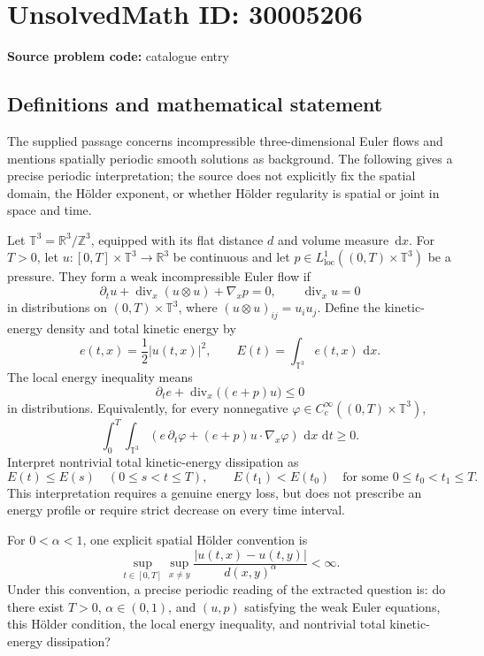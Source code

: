 \documentclass[11pt]{article}
\newcommand{\dd}{\,\mathrm{d}}
\begin{document}
\section*{UnsolvedMath ID: 30005206}
\textbf{Source problem code:} catalogue entry
\subsection{Definitions and mathematical statement}
The supplied passage concerns incompressible three-dimensional Euler flows and mentions spatially periodic smooth solutions as background. The following gives a precise periodic interpretation; the source does not explicitly fix the spatial domain, the Hölder exponent, or whether Hölder regularity is spatial or joint in space and time.

Let \(\mathbb T^3=\mathbb R^3/\mathbb Z^3\), equipped with its flat distance \(d\) and volume measure \(\dd x\). For \(T>0\), let \(u\colon[0,T]\times\mathbb T^3\to\mathbb R^3\) be continuous and let \(p\in L^1_{\mathrm{loc}}((0,T)\times\mathbb T^3)\) be a pressure. They form a weak incompressible Euler flow if
\[
\partial_t u+\operatorname{div}_x(u\otimes u)+\nabla_x p=0,
\qquad \operatorname{div}_x u=0
\]
in distributions on \((0,T)\times\mathbb T^3\), where \((u\otimes u)_{ij}=u_i u_j\). Define the kinetic-energy density and total kinetic energy by
\[
e(t,x)=\frac12|u(t,x)|^2,
\qquad E(t)=\int_{\mathbb T^3}e(t,x)\,\dd x.
\]
The local energy inequality means
\[
\partial_t e+\operatorname{div}_x\bigl((e+p)u\bigr)\leq0
\]
in distributions. Equivalently, for every nonnegative \(\varphi\in C_c^\infty((0,T)\times\mathbb T^3)\),
\[
\int_0^T\!\int_{\mathbb T^3}
\left(e\,\partial_t\varphi+(e+p)u\cdot\nabla_x\varphi\right)\,\dd x\,\dd t\geq0.
\]
Interpret nontrivial total kinetic-energy dissipation as
\[
E(t)\leq E(s)\quad(0\leq s<t\leq T),
\qquad E(t_1)<E(t_0)\quad\text{for some }0\leq t_0<t_1\leq T.
\]
This interpretation requires a genuine energy loss, but does not prescribe an energy profile or require strict decrease on every time interval.

For \(0<\alpha<1\), one explicit spatial Hölder convention is
\[
\sup_{t\in[0,T]}\sup_{x\ne y}
\frac{|u(t,x)-u(t,y)|}{d(x,y)^\alpha}<\infty.
\]
Under this convention, a precise periodic reading of the extracted question is: do there exist \(T>0\), \(\alpha\in(0,1)\), and \((u,p)\) satisfying the weak Euler equations, this Hölder condition, the local energy inequality, and nontrivial total kinetic-energy dissipation?
\end{document}
